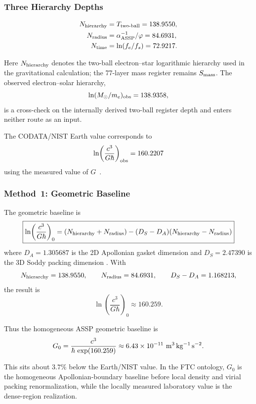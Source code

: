 \documentclass[11pt,a4paper]{article}
\begin{document}
    \subsubsection{Three Hierarchy Depths}

      \begin{align}
        N_{\rm hierarchy}   &= T_{\rm two\text{-}ball} = 138.9550, \\
        N_{\rm radius} &= \alpha^{-1}_{\rm ASSP}/\varphi = 84.6931, \\
        N_{\rm time}   &= \ln(f_e/f_s) = 72.9217.
      \end{align}

      Here \(N_{\rm hierarchy}\) denotes the two-ball electron--star logarithmic hierarchy used in the gravitational calculation; the 77-layer mass register remains \(S_{\rm mass}\). The observed electron--solar hierarchy,
      \[
      \ln(M_\odot/m_e)_{\rm obs}=138.9358,
      \]
      is a cross-check on the internally derived two-ball register depth and enters neither route as an input.

      The CODATA/NIST Earth value corresponds to
      \[
      \ln\!\left(\frac{c^3}{G\hbar}\right)_{\rm obs}
      =
      160.2207
      \]
      using the measured value of \(G\)~\cite{CODATA2022}.

    \subsubsection{Method~1: Geometric Baseline}

      The geometric baseline is
      \[
      \boxed{
        \ln\!\left(\frac{c^3}{G\hbar}\right)_0
        =
        (N_{\rm hierarchy}+N_{\rm radius})
        -
        (D_S-D_A)(N_{\rm hierarchy}-N_{\rm radius})
      }
      \]
      where \(D_A = 1.305687\) is the 2D Apollonian gasket dimension
      \cite{Manna1991} and \(D_S = 2.47390\) is the 3D Soddy packing dimension
      \cite{Boyd1973}. With
      \[
      N_{\rm hierarchy}=138.9550,\qquad
      N_{\rm radius}=84.6931,\qquad
      D_S-D_A=1.168213,
      \]
      the result is
      \[
      \ln\!\left(\frac{c^3}{G\hbar}\right)_0
      \approx
      160.259.
      \]

      Thus the homogeneous ASSP geometric baseline is
      \[
      G_0
      =
      \frac{c^3}{\hbar\,\exp(160.259)}
      \approx
      6.43\times10^{-11}\ {\rm m^3\,kg^{-1}\,s^{-2}}.
      \]

      This sits about \(3.7\%\) below the Earth/NIST value. In the FTC ontology, \(G_0\) is the homogeneous Apollonian-boundary baseline before local density and virial packing renormalization, while the locally measured laboratory value is the dense-region realization.
\end{document}
